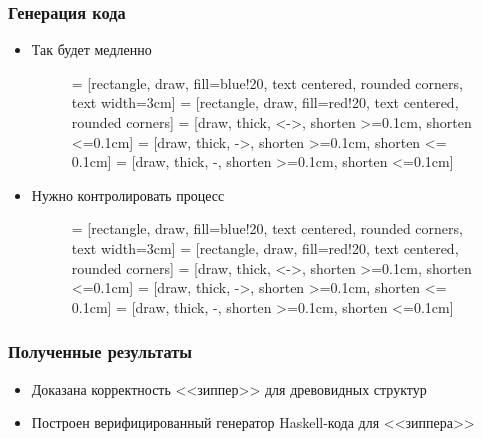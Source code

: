 \documentclass{beamer}
\begin{document}
\begin{frame}
\frametitle{Генерация кода}
\begin{itemize}
\item Так будет медленно
\begin{figure}[H]
\centering
{} = [rectangle, draw, fill=blue!20, text centered, rounded corners, text width=3cm]
 = [rectangle, draw, fill=red!20, text centered, rounded corners]
 = [draw, thick, <->, shorten >=0.1cm, shorten <=0.1cm]
 = [draw, thick, ->, shorten >=0.1cm, shorten <= 0.1cm]
 = [draw, thick, -, shorten >=0.1cm, shorten <=0.1cm]
\end{figure}

\item Нужно контролировать процесс
\begin{figure}[H]
\centering
{} = [rectangle, draw, fill=blue!20, text centered, rounded corners, text width=3cm]
 = [rectangle, draw, fill=red!20, text centered, rounded corners]
 = [draw, thick, <->, shorten >=0.1cm, shorten <=0.1cm]
 = [draw, thick, ->, shorten >=0.1cm, shorten <= 0.1cm]
 = [draw, thick, -, shorten >=0.1cm, shorten <=0.1cm]
\end{figure}
\end{itemize}
\end{frame}

\begin{frame}
\frametitle{Полученные результаты}
\begin{itemize}
\item Доказана корректность <<зиппер>> для древовидных структур
\item Построен верифицированный генератор Haskell-кода для <<зиппера>>
\end{itemize}
\end{frame}
\end{document}
